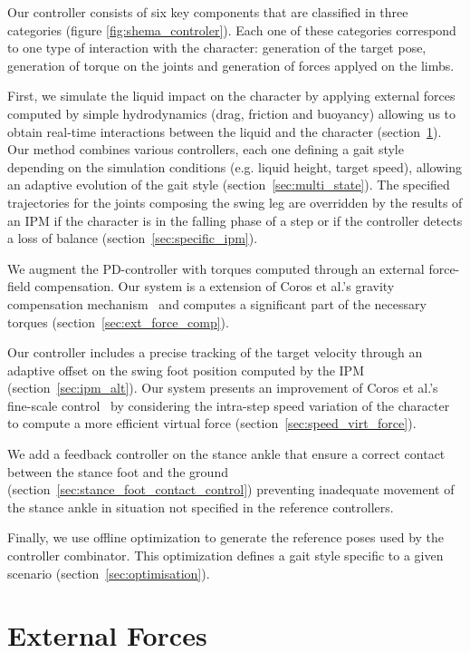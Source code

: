 \documentclass[runningheads,a4paper,10pt]{llncs}
\begin{document}
Our controller consists of six key components that are classified in three categories (figure \ref{fig:shema_controler}). Each one of these categories correspond to one type of interaction with the character: generation of the target pose, generation of torque on the joints and generation of forces applyed on the limbs.

First, we simulate the liquid impact on the character by applying external forces computed by simple hydrodynamics (drag, friction and buoyancy) allowing us to obtain real-time interactions between the liquid and the character (section~\ref{sec:ext_forces}). Our method combines various controllers, each one defining a gait style depending on the simulation conditions (e.g. liquid height, target speed), allowing an adaptive evolution of the gait style (section~\ref{sec:multi_state}). The specified trajectories for the joints composing the swing leg are overridden by the results of an IPM if the character is in the falling phase of a step or if the controller detects a loss of balance (section~\ref{sec:specific_ipm}).

We augment the PD-controller with torques computed through an external force-field compensation. Our system is a extension of Coros et al.'s gravity compensation mechanism~\citep{coros2010generalized} and computes a significant part of the necessary torques (section~\ref{sec:ext_force_comp}).

Our controller includes a precise tracking of the target velocity through an adaptive offset on the swing foot position computed by the IPM (section~\ref{sec:ipm_alt}). Our system presents an improvement of Coros et al.'s fine-scale control~\citep{coros2010generalized} by considering the intra-step speed variation of the character to compute a more efficient virtual force (section~\ref{sec:speed_virt_force}).

We add a feedback controller on the stance ankle that ensure a correct contact between the stance foot and the ground (section~\ref{sec:stance_foot_contact_control}) preventing inadequate movement of the stance ankle in situation not specified in the reference controllers.

Finally, we use offline optimization to generate the reference poses used by the controller combinator. This optimization defines a gait style specific to a given scenario (section~\ref{sec:optimisation}).

\section{External Forces}
\label{sec:ext_forces}
\end{document}
